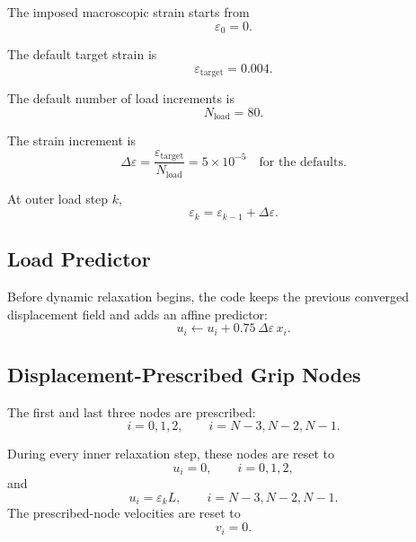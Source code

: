 \documentclass[11pt]{article}
\begin{document}
The imposed macroscopic strain starts from
\begin{equation}
    \varepsilon_0=0 .
\end{equation}

The default target strain is
\begin{equation}
    \varepsilon_{\mathrm{target}} = 0.004.
\end{equation}

The default number of load increments is
\begin{equation}
    N_{\mathrm{load}} = 80.
\end{equation}

The strain increment is
\begin{equation}
    \Delta\varepsilon =
    \frac{\varepsilon_{\mathrm{target}}}{N_{\mathrm{load}}}
    =
    5\times 10^{-5}
    \quad
    \text{for the defaults.}
\end{equation}

At outer load step \(k\),
\begin{equation}
    \varepsilon_k =
    \varepsilon_{k-1}+\Delta\varepsilon.
\end{equation}

\subsection{Load Predictor}

Before dynamic relaxation begins, the code keeps the previous converged
displacement field and adds an affine predictor:
\begin{equation}
    u_i
    \leftarrow
    u_i + 0.75\,\Delta\varepsilon\,x_i .
\end{equation}

\subsection{Displacement-Prescribed Grip Nodes}

The first and last three nodes are prescribed:
\begin{equation}
    i=0,1,2,
    \qquad
    i=N-3,N-2,N-1.
\end{equation}

During every inner relaxation step, these nodes are reset to
\begin{equation}
    u_i = 0,
    \qquad i=0,1,2,
\end{equation}
and
\begin{equation}
    u_i = \varepsilon_k L,
    \qquad i=N-3,N-2,N-1.
\end{equation}
The prescribed-node velocities are reset to
\begin{equation}
    v_i = 0 .
\end{equation}
\end{document}
